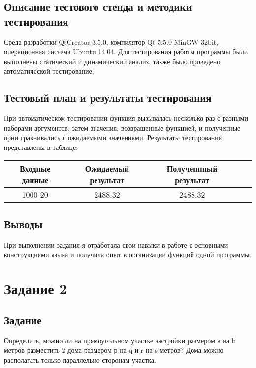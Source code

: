 \documentclass[12pt,a4paper]{report}
\begin{document}
\subsection{Описание тестового стенда и методики тестирования}
Среда разработки QtCreator 3.5.0, компилятор Qt 5.5.0 MinGW 32bit, операционная система Ubuntu 14.04.
Для тестирования работы программы были выполнены статический и динамический анализ, также было проведено автоматической тестирование.

\subsection{Тестовый план и результаты тестирования}
		При автоматическом тестировании функция вызывалась несколько раз с разными наборами аргументов, затем значения, возвращенные функцией, и полученные орни сравнивались с ожидаемыми значениями. Результаты тестирования представлены в таблице:  
	 

 \begin{tabular}{|c|c|c|c|c|}
	\hline 	
	Входные данные& Ожидаемый результат & Полученнный результат \\
	\hline
	1000 20 & 2488.32 & 2488.32 \\
	\hline
 \end{tabular}
\subsection{Выводы}
При выполнении задания я отработала свои навыки в работе с основными конструкциями языка и получила опыт в организации функций одной программы.


%

%


\section{Задание 2}
\subsection{Задание}
Определить, можно ли на прямоугольном участке застройки размером а на b метров разместить 2 дома размером р на q и r на s метров? Дома можно располагать только параллельно сторонам участка.
	
\end{document}
